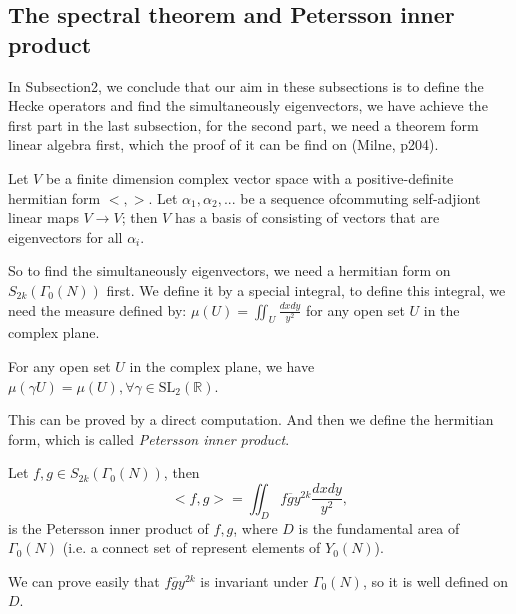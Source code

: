     \subsection{The spectral theorem and Petersson inner product}

    In Subsection2, we conclude that our aim in these  subsections is to define the Hecke operators and find the simultaneously eigenvectors, we have achieve the first part  in the last subsection, for the second part, we need a theorem form linear algebra first, which the proof of it can be find on (Milne, p204).

    \begin{theorem}\label{The spectral theorem}
        Let $V$ be a finite dimension complex vector space with a positive-definite hermitian form $<,>$. Let $\alpha_1,\alpha_2,...$ be a sequence ofcommuting self-adjiont linear maps $V\to V$; then $V$ has a basis of consisting of vectors that are eigenvectors for all $\alpha_i$.  
    \end{theorem}

    So to find the  simultaneously eigenvectors, we need a hermitian form on $S_{2k}(\Gamma_0(N))$ first. We define it by a special integral, to define this integral, we need the measure defined by: $\mu (U)=\iint_U \frac{dxdy}{y^2}$ for any open set $U$ in the complex plane.
    
    \begin{proposition}
        For any open set $U$ in the complex plane, we have $\mu(\gamma U)=\mu(U), \forall \gamma \in \mathrm{SL}_2(\mathbb{R})$.
    \end{proposition}

    This can be proved by a direct computation. And then we define the hermitian form, which is called \textit{Petersson inner product}.

    \begin{definition}[Petersson]
        Let $f,g\in S_{2k}(\Gamma_0(N))$, then 
        $$<f,g>=\iint_D f\overline{g}y^{2k} \frac{dxdy}{y^2},$$
        is the Petersson inner product of $f,g$, where $D$ is the fundamental area of $\Gamma_0(N)$ (i.e. a connect set of represent elements of $Y_0(N)$).
    \end{definition}

    \begin{remark}
        We can prove easily that $f\overline{g}y^{2k}$ is invariant under $\Gamma_0(N)$, so it is well defined on $D$.
    \end{remark}

